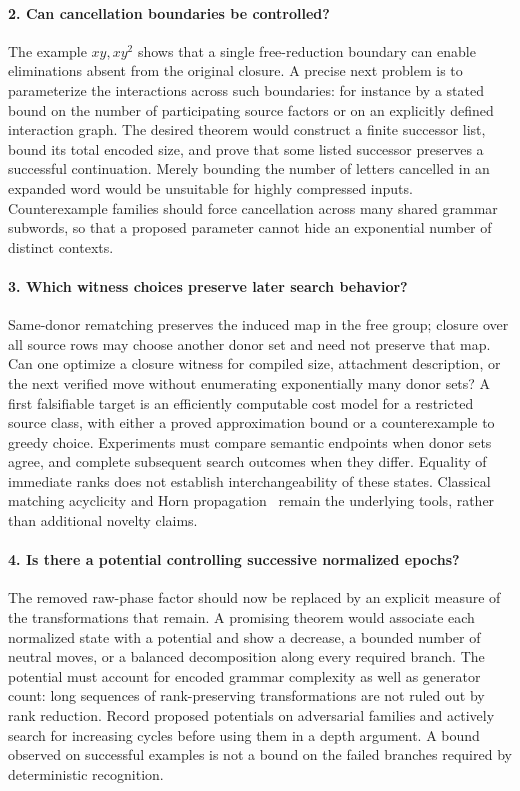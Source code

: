 \paragraph{2. Can cancellation boundaries be controlled?}
The example $xy,xy^2$ shows that a single free-reduction boundary can
enable eliminations absent from the original closure. A precise next
problem is to parameterize the interactions across such boundaries:
for instance by a stated bound on the number of participating source
factors or on an explicitly defined interaction graph. The desired
theorem would construct a finite successor list, bound its total encoded
size, and prove that some listed successor preserves a successful
continuation. Merely bounding the number of letters cancelled in an
expanded word would be unsuitable for highly compressed inputs.
Counterexample families should force cancellation across many shared
grammar subwords, so that a proposed parameter cannot hide an exponential
number of distinct contexts.

\paragraph{3. Which witness choices preserve later search behavior?}
Same-donor rematching preserves the induced map in the free group; closure
over all source rows may choose another donor set and need not preserve
that map. Can one optimize a closure witness for compiled size, attachment
description, or the next verified move without enumerating exponentially
many donor sets? A first falsifiable target is an efficiently computable
cost model for a restricted source class, with either a proved
approximation bound or a counterexample to greedy choice. Experiments
must compare semantic endpoints when donor sets agree, and complete
subsequent search outcomes when they differ. Equality of immediate ranks
does not establish interchangeability of these states. Classical matching
acyclicity and Horn propagation~\cite{kozen,dowling} remain the underlying
tools, rather than additional novelty claims.

\paragraph{4. Is there a potential controlling successive normalized epochs?}
The removed raw-phase factor should now be replaced by an explicit measure
of the transformations that remain. A promising theorem would associate
each normalized state with a potential and show a decrease, a bounded
number of neutral moves, or a balanced decomposition along every required
branch. The potential must account for encoded grammar complexity as well
as generator count: long sequences of rank-preserving transformations are
not ruled out by rank reduction. Record proposed potentials on adversarial
families and actively search for increasing cycles before using them in a
depth argument. A bound observed on successful examples is not a bound on
the failed branches required by deterministic recognition.

